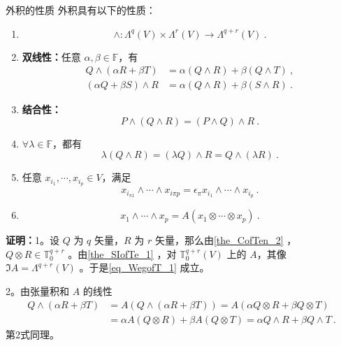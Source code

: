 \begin{theorem}{外积的性质}
外积具有以下的性质：
\begin{enumerate}
\item \begin{equation}\label{eq_WegofT_1}
\wedge:\Lambda^q(V)\times\Lambda^r(V)\rightarrow\Lambda^{q+r}(V)~.
\end{equation}
\item \textbf{双线性：}任意 $\alpha,\beta\in\mathbb F$，有
\begin{equation}
\begin{aligned}
Q\wedge(\alpha R+\beta T)&=\alpha(Q\wedge R)+\beta(Q\wedge T)~,\\
(\alpha Q+\beta S)\wedge R&=\alpha (Q\wedge R)+\beta (S\wedge R)~.
\end{aligned}
\end{equation}
\item \textbf{结合性：}
\begin{equation}
P\wedge (Q\wedge R)=(P\wedge Q)\wedge R~.
\end{equation}
\item $\forall \lambda\in\mathbb F$，都有
\begin{equation}\label{eq_WegofT_4}
\lambda(Q\wedge R)=(\lambda Q)\wedge R=Q\wedge(\lambda R)~.
\end{equation}

\item 任意 $x_{i_1},\cdots,x_{i_p}\in V$，满足
\begin{equation}\label{eq_WegofT_6}
x_{i_{\pi 1}}\wedge\cdots \wedge x_{i\pi p}=\epsilon_\pi x_{i_1}\wedge\cdots\wedge x_{i_p}~.
\end{equation}
\item 
\begin{equation}\label{eq_WegofT_5}
x_1\wedge\cdots\wedge x_p=A(x_1\otimes\cdots\otimes x_p)~.
\end{equation}
\end{enumerate}

\end{theorem}
\textbf{证明：}1。设 $Q$ 为 $q$ 矢量，$R$ 为 $r$ 矢量，那么由\autoref{the_CofTen_2}  ， $Q\otimes R\in\mathbb T_0^{q+r}$ 。由\autoref{the_SIofTe_1}  ，对 $\mathbb T_0^{q+r}(V)$ 上的 $A$，其像 $\Im A=\Lambda ^{q+r}(V)$ 。于是\autoref{eq_WegofT_1} 成立。

2。由张量积和 $A$ 的线性
\begin{equation}
\begin{aligned}
Q\wedge(\alpha R+\beta T)&=A(Q\wedge(\alpha R+\beta T))=A(\alpha Q\otimes R+\beta Q\otimes T)\\
&=\alpha A(Q\otimes R)+\beta A(Q\otimes T)=\alpha Q\wedge R+\beta Q\wedge T~.
\end{aligned}
\end{equation}
第2式同理。

